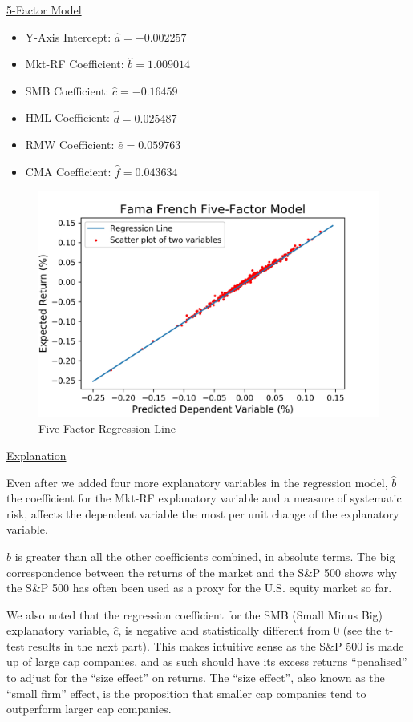 \documentclass[a4paper]{article}
\begin{document}
\underline{5-Factor Model}
\begin{itemize}[nosep]
	\item Y-Axis Intercept: $\hat{a} = -0.002257$
	\item Mkt-RF Coefficient: $\hat{b} = 1.009014$
	\item SMB Coefficient: $\hat{c} = -0.16459$
	\item HML Coefficient: $\hat{d} = 0.025487$
	\item RMW Coefficient: $\hat{e} = 0.059763$
	\item CMA Coefficient: $\hat{f} = 0.043634$
\end{itemize}

\newpage
\begin{figure}[ht]
	\centering
	\includegraphics[width= \linewidth]{FF_regression.jpeg}
	\captionsetup{font=small}
	\caption{Five Factor Regression Line}
\end{figure}

\underline{Explanation}

Even after we added four more explanatory variables in the regression model, $\hat{b}$ the coefficient for the Mkt-RF explanatory variable and a measure of systematic risk, affects the dependent variable the most per unit change of the explanatory variable. 

$\hat{b}$ is greater than all the other coefficients combined, in absolute terms. The big correspondence between the returns of the market and the S\&P 500 shows why the S\&P 500 has often been used as a proxy for the U.S. equity market so far.

We also noted that the regression coefficient for the SMB (Small Minus Big) explanatory variable, $\hat{c}$, is negative and statistically different from 0 (see the t-test results in the next part). This makes intuitive sense as the S\&P 500 is made up of large cap companies, and as such should have its excess returns “penalised” to adjust for the “size effect” on returns. The “size effect”, also known as the “small firm” effect, is the proposition that smaller cap companies tend to outperform larger cap companies.
\end{document}
